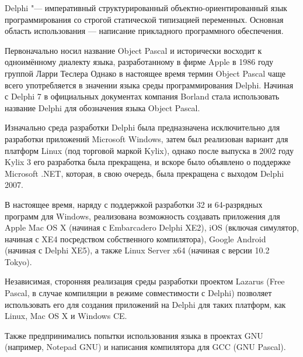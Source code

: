 \documentclass[14pt]{beamer}
\begin{document}
\begin{frame}[label=Delphi]
\begin{block}{Delphi "---}
императивный структурированный объектно-ориентированный язык программирования со строгой статической типизацией переменных. Основная область использования — написание прикладного программного обеспечения.
\end{block}
\end{frame}
\begin{frame}[shrink=10]
\begin{block}{}

    Первоначально носил название Object Pascal и исторически восходит к одноимённому диалекту языка, разработанному в фирме Apple в 1986 году группой Ларри Теслера Однако в настоящее время термин Object Pascal чаще всего употребляется в значении языка среды программирования Delphi. Начиная с Delphi 7 в официальных документах компания Borland стала использовать название Delphi для обозначения языка Object Pascal.
\end{block}
\end{frame}
\begin{frame}
    \begin{block}
    
    Изначально среда разработки Delphi была предназначена исключительно для разработки приложений Microsoft Windows, затем был реализован вариант для платформ Linux (под торговой маркой Kylix), однако после выпуска в 2002 году Kylix 3 его разработка была прекращена, и вскоре было объявлено о поддержке Microsoft .NET, которая, в свою очередь, была прекращена с выходом Delphi 2007.
    \end{block}
\end{frame}

\begin{frame}
    \begin{block}
    
    В настоящее время, наряду с поддержкой разработки 32 и 64-разрядных программ для Windows, реализована возможность создавать приложения для Apple Mac OS X (начиная с Embarcadero Delphi XE2), iOS (включая симулятор, начиная с XE4 посредством собственного компилятора), Google Android (начиная с Delphi XE5), а также Linux Server x64 (начиная с версии 10.2 Tokyo).
    \end{block}
\end{frame}

\begin{frame}
    \begin{block}
    
    Независимая, сторонняя реализация среды разработки проектом Lazarus (Free Pascal, в случае компиляции в режиме совместимости с Delphi) позволяет использовать его для создания приложений на Delphi для таких платформ, как Linux, Mac OS X и Windows CE.

    Также предпринимались попытки использования языка в проектах GNU (например, Notepad GNU) и написания компилятора для GCC (GNU Pascal).
\end{block}
\end{frame}
\end{document}

